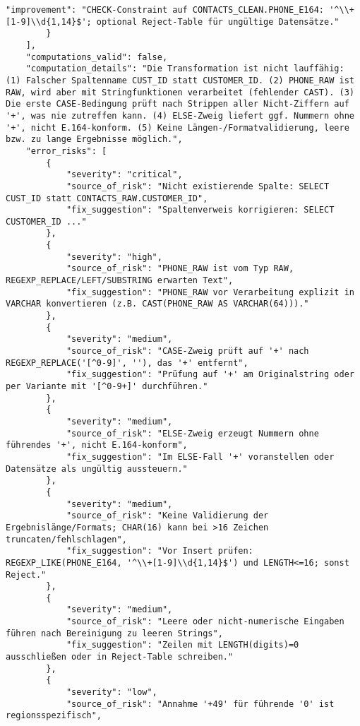 \begin{lstlisting}[caption={Ausgabe: GPT-5 Anwendungsfall 3 Robustheitsdurchlauf},label={gpt_case3_prompt3}]
            "improvement": "CHECK-Constraint auf CONTACTS_CLEAN.PHONE_E164: '^\\+[1-9]\\d{1,14}$'; optional Reject-Table für ungültige Datensätze."
        }
    ],
    "computations_valid": false,
    "computation_details": "Die Transformation ist nicht lauffähig: (1) Falscher Spaltenname CUST_ID statt CUSTOMER_ID. (2) PHONE_RAW ist RAW, wird aber mit Stringfunktionen verarbeitet (fehlender CAST). (3) Die erste CASE-Bedingung prüft nach Strippen aller Nicht-Ziffern auf '+', was nie zutreffen kann. (4) ELSE-Zweig liefert ggf. Nummern ohne '+', nicht E.164-konform. (5) Keine Längen-/Formatvalidierung, leere bzw. zu lange Ergebnisse möglich.",
    "error_risks": [
        {
            "severity": "critical",
            "source_of_risk": "Nicht existierende Spalte: SELECT CUST_ID statt CONTACTS_RAW.CUSTOMER_ID",
            "fix_suggestion": "Spaltenverweis korrigieren: SELECT CUSTOMER_ID ..."
        },
        {
            "severity": "high",
            "source_of_risk": "PHONE_RAW ist vom Typ RAW, REGEXP_REPLACE/LEFT/SUBSTRING erwarten Text",
            "fix_suggestion": "PHONE_RAW vor Verarbeitung explizit in VARCHAR konvertieren (z.B. CAST(PHONE_RAW AS VARCHAR(64)))."
        },
        {
            "severity": "medium",
            "source_of_risk": "CASE-Zweig prüft auf '+' nach REGEXP_REPLACE('[^0-9]', ''), das '+' entfernt",
            "fix_suggestion": "Prüfung auf '+' am Originalstring oder per Variante mit '[^0-9+]' durchführen."
        },
        {
            "severity": "medium",
            "source_of_risk": "ELSE-Zweig erzeugt Nummern ohne führendes '+', nicht E.164-konform",
            "fix_suggestion": "Im ELSE-Fall '+' voranstellen oder Datensätze als ungültig aussteuern."
        },
        {
            "severity": "medium",
            "source_of_risk": "Keine Validierung der Ergebnislänge/Formats; CHAR(16) kann bei >16 Zeichen truncaten/fehlschlagen",
            "fix_suggestion": "Vor Insert prüfen: REGEXP_LIKE(PHONE_E164, '^\\+[1-9]\\d{1,14}$') und LENGTH<=16; sonst Reject."
        },
        {
            "severity": "medium",
            "source_of_risk": "Leere oder nicht-numerische Eingaben führen nach Bereinigung zu leeren Strings",
            "fix_suggestion": "Zeilen mit LENGTH(digits)=0 ausschließen oder in Reject-Table schreiben."
        },
        {
            "severity": "low",
            "source_of_risk": "Annahme '+49' für führende '0' ist regionsspezifisch",

\end{lstlisting}
